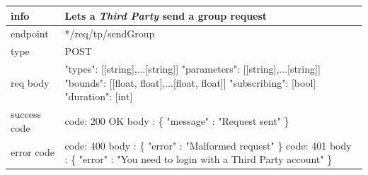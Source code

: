 \documentclass[titlepage]{article}
\begin{document}
	\begin{tabularx}{\textwidth}{lX} \hline
		info & Lets a {\it Third Party} send a group request \\ \hline
		endpoint & */req/tp/sendGroup \\ \hline
		type & POST \\ \hline
		req body &
		"types": [[string],...[string]] \newline
		"parameters": [[string],...[string]] \newline
		"bounds": [[float, float],...[float, float]] \newline
		"subscribing": [bool] \newline
		"duration": [int] \\ \hline
		success code &
		code: 200 OK \newline  
		body : \{ \newline
		"message" : "Request sent" \newline
		\} \\ \hline
		error code &
		code: 400 \newline
		body : \{ "error" : "Malformed request" \} \newline \newline
		code: 401 \newline
		body : \{ "error" : "You need to login with a Third Party account" \}\\ \hline
	\end{tabularx}
	
	\vspace{\baselineskip}
	
\end{document}
